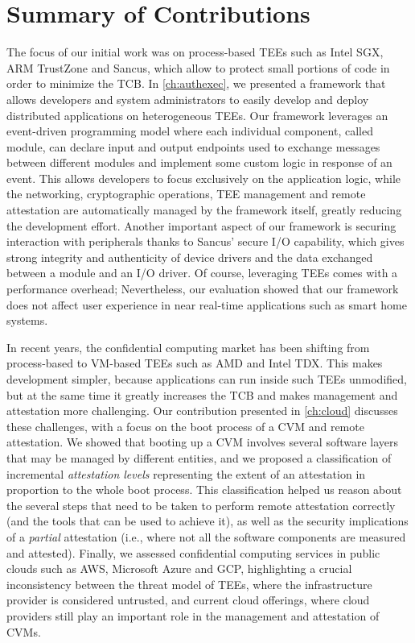 \section{Summary of Contributions}
\label{thesis:concl-summary}

The focus of our initial work was on process-based \acp{TEE} such as Intel
\ac{SGX}, ARM TrustZone and Sancus, which allow to protect small portions of
code in order to minimize the \ac{TCB}. In \cref{ch:authexec}, we presented a
framework that allows developers and system administrators to easily develop and
deploy distributed applications on heterogeneous \acp{TEE}. Our framework
leverages an event-driven programming model where each individual component,
called module, can declare input and output endpoints used to exchange messages
between different modules and implement some custom logic in response of an
event. This allows developers to focus exclusively on the application logic,
while the networking, cryptographic operations, \ac{TEE} management and remote
attestation are automatically managed by the framework itself, greatly reducing
the development effort. Another important aspect of our framework is securing
interaction with peripherals thanks to Sancus' secure I/O capability, which
gives strong integrity and authenticity of device drivers and the data exchanged
between a module and an I/O driver. Of course, leveraging \acp{TEE} comes with a
performance overhead; Nevertheless, our evaluation showed that our framework
does not affect user experience in near real-time applications such as smart
home systems.

In recent years, the confidential computing market has been shifting from
process-based to \acs{VM}-based \acp{TEE} such as AMD \sevsnp{} and Intel
\ac{TDX}. This makes development simpler, because applications can run inside
such \acp{TEE} unmodified, but at the same time it greatly increases the
\ac{TCB} and makes management and attestation more challenging. Our contribution
presented in \cref{ch:cloud} discusses these challenges, with a focus on the
boot process of a \ac{CVM} and remote attestation. We showed that booting up a
\ac{CVM} involves several software layers that may be managed by different
entities, and we proposed a classification of incremental \emph{attestation
levels} representing the extent of an attestation in proportion to the whole
boot process. This classification helped us reason about the several steps that
need to be taken to perform remote attestation correctly (and the tools that can
be used to achieve it), as well as the security implications of a \emph{partial}
attestation (i.e., where not all the software components are measured and
attested). Finally, we assessed confidential computing services in public clouds
such as \ac{AWS}, Microsoft Azure and \ac{GCP}, highlighting a crucial
inconsistency between the threat model of \acp{TEE}, where the infrastructure
provider is considered untrusted, and current cloud offerings, where cloud
providers still play an important role in the management and attestation of
\acp{CVM}.

